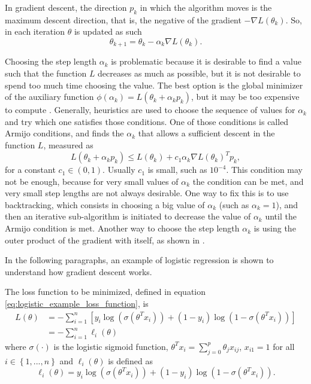 In gradient descent, the direction $p_k$ in which the algorithm moves is the maximum descent direction, that is, the negative of the gradient $-\nabla L(\theta_k)$. So, in each iteration $\theta$ is updated as such
\begin{equation}
  \label{eq:parameter_update_gd}
  \theta_{k+1} = \theta_k - \alpha_k \nabla L(\theta_k).
\end{equation}

Choosing the step length $\alpha_k$ is problematic because it is desirable to find a value such that the function $L$ decreases as much as possible, but it is not desirable to spend too much time choosing the value. The best option is the global minimizer of the auxiliary function $\phi(\alpha_k) = L(\theta_k + \alpha_k p_k)$, but it may be too expensive to compute \cite[p.~31]{nocedal2006numerical}. Generally, heuristics are used to choose the sequence of values for $\alpha_k$ and try which one satisfies those conditions. One of those conditions is called Armijo conditions, and finds the $\alpha_k$ that allows a sufficient descent in the function $L$, measured as
\begin{equation}
    L(\theta_k + \alpha_k p_k) \leq L(\theta_k) + c_1 \alpha_k \nabla L(\theta_k)^T p_k,
\end{equation}
for a constant $c_1 \in (0, 1)$. Usually $c_1$ is small, such as $10^{-4}$. This condition may not be enough, because for very small values of $\alpha_k$ the condition can be met, and very small step lengths are not always desirable. One way to fix this is to use backtracking, which consists in choosing a big value of $\alpha_k$ (such as $\alpha_k = 1$), and then an iterative sub-algorithm is initiated to decrease the value of $\alpha_k$ until the Armijo condition is met. Another way to choose the step length $\alpha_k$ is using the outer product of the gradient with itself, as shown in \cite{duchi2011adaptive}.

In the following paragraphs, an example of logistic regression is shown to understand how gradient descent works.

The loss function to be minimized, defined in equation \eqref{eq:logistic_example_loss_function}, is
\begin{equation}
  \begin{split}
    L(\theta) & = - \sum_{i=1}^{n} \left[ y_i \log(\sigma(\theta^T x_i)) + (1-y_i) \log(1-\sigma(\theta^T x_i)) \right] \\
    & = - \sum_{i=1}^{n}{\ell_i(\theta)}
  \end{split}
\end{equation}
where $\sigma(\cdot)$ is the logistic sigmoid function, $\theta^T x_i = \sum_{j=0}^{p}{\theta_j x_{ij}}$, $x_{i1} = 1$ for all $i \in \left\{1, ..., n \right\}$ and $\ell_i(\theta)$ is defined as
\begin{equation}
  \ell_i(\theta) = y_i \log(\sigma(\theta^T x_i)) + (1-y_i) \log(1-\sigma(\theta^T x_i)).
\end{equation}

